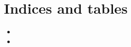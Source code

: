 \documentclass[letterpaper,10pt,english]{sphinxmanual}
\begin{document}
\begin{DUlineblock}{0em}
\item[] 
\end{DUlineblock}

{\hyperref[\detokenize{index:mastertoc}]{}}


\chapter{Indices and tables}
\label{\detokenize{index:indices-and-tables}}\begin{itemize}
\item {} 

\item {} 

\end{itemize}



\renewcommand{\indexname}{Index}
\printindex
\end{document}
